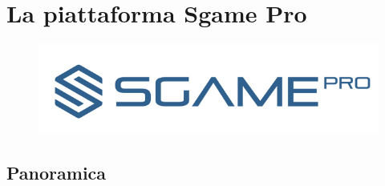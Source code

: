 \documentclass[11pt]{thesistemp}
\begin{document}
\section{La piattaforma Sgame Pro}
\begin{figure}[h]\hfill
    \centering
    \includegraphics[width=\textwidth]{sgamepro-logo.png}
    \label{fig:sgamepro}
\end{figure}

\subsection{Panoramica}
\end{document}
